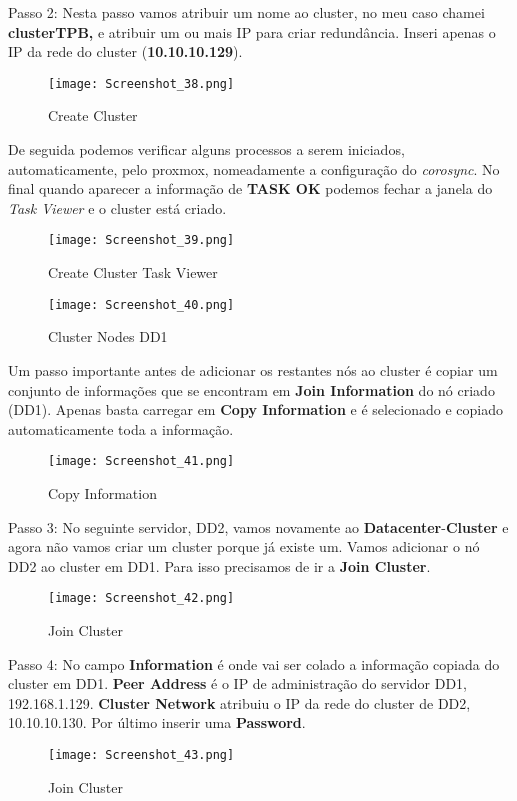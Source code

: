 Passo 2: Nesta passo vamos atribuir um nome ao cluster, no meu caso chamei \textbf{clusterTPB,} e atribuir um ou mais \ac{IP} para criar redundância. Inseri apenas o \ac{IP} da rede do cluster (\textbf{10.10.10.129}).
\begin{figure}[H]
\center
\texttt{[image: Screenshot\_38.png]}
\caption{Create Cluster}
\end{figure}

\newpage
De seguida podemos verificar alguns processos a serem iniciados, automaticamente, pelo proxmox, nomeadamente a configuração do \textit{corosync}. No final quando aparecer a informação de \textbf{TASK OK} podemos fechar a janela do \textit{Task Viewer} e o cluster está criado.
\begin{figure}[H]
\center
\texttt{[image: Screenshot\_39.png]}
\caption{Create Cluster Task Viewer}
\end{figure}

\begin{figure}[H]
\center
\texttt{[image: Screenshot\_40.png]}
\caption{Cluster Nodes DD1}
\end{figure}

\newpage
Um passo importante antes de adicionar os restantes nós ao cluster é copiar um conjunto de informações que se encontram em \textbf{Join Information} do nó criado (DD1). Apenas basta carregar em \textbf{Copy Information} e é selecionado e copiado automaticamente toda a informação.

\begin{figure}[H]
\center
\texttt{[image: Screenshot\_41.png]}
\caption{Copy Information}
\end{figure}

Passo 3: No seguinte servidor, DD2, vamos novamente ao \textbf{Datacenter}-\textbf{Cluster} e agora não vamos criar um cluster porque já existe um. Vamos adicionar o nó DD2 ao cluster em DD1. Para isso precisamos de ir a \textbf{Join Cluster}.
\begin{figure}[H]
\center
\texttt{[image: Screenshot\_42.png]}
\caption{Join Cluster}
\end{figure}

\newpage
Passo 4: No campo \textbf{Information} é onde vai ser colado a informação copiada do cluster em DD1. \textbf{Peer Address} é o \ac{IP} de administração do servidor DD1, 192.168.1.129. \textbf{Cluster Network} atribuiu o \ac{IP} da rede do cluster de DD2, 10.10.10.130. Por último inserir uma \textbf{Password}.
\begin{figure}[H]
\center
\texttt{[image: Screenshot\_43.png]}
\caption{Join Cluster}
\end{figure}

